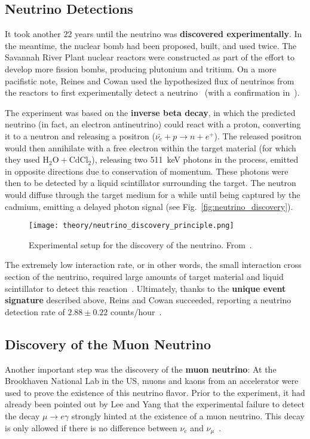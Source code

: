 \subsection{Neutrino Detections}
It took another 22 years until the neutrino was \textbf{discovered experimentally}. In the meantime, the nuclear bomb had been proposed, built, and used twice. The Savannah River Plant nuclear reactors were constructed as part of the effort to develop more fission bombs, producing plutonium and tritium. On a more pacifistic note, Reines and Cowan used the hypothesized flux of neutrinos from the reactors to first experimentally detect a neutrino~\cite{Reines1956} (with a confirmation in~).

The experiment was based on the \textbf{inverse beta decay}, in which the predicted neutrino (in fact, an electron antineutrino) could react with a proton, converting it to a neutron and releasing a positron ($\bar{\nu_e} + p \rightarrow n + e^+$). The released positron would then annihilate with a free electron within the target material (for which they used $\text{H}_2\text{O} + \text{CdCl}_2$), releasing two \SI{511}{\kilo\eV} photons in the process, emitted in opposite directions due to conservation of momentum. These photons were then to be detected by a liquid scintillator surrounding the target. The neutron would diffuse through the target medium for a while until being captured by the cadmium, emitting a delayed photon signal (see Fig.~\ref{fig:neutrino_discovery}).

\begin{figure}[htb]
    \texttt{[image: theory/neutrino\_discovery\_principle.png]}
    \caption[Neutrino discovery schematic]{Experimental setup for the discovery of the neutrino. From~\cite{Reines1956}.}
\end{figure}

The extremely low interaction rate, or in other words, the small interaction cross section of the neutrino, required large amounts of target material and liquid scintillator to detect this reaction~\cite{Giunti2007}. Ultimately, thanks to the \textbf{unique event signature} described above, Reins and Cowan succeeded, reporting a neutrino detection rate of $2.88 \pm 0.22$ counts/hour~\cite{Reines1956}.

\subsection{Discovery of the Muon Neutrino}
Another important step was the discovery of the \textbf{muon neutrino}: At the Brookhaven National Lab in the US, muons and kaons from an accelerator were used to prove the existence of this neutrino flavor. Prior to the experiment, it had already been pointed out by Lee and Yang that the experimental failure to detect the decay $\mu \rightarrow e \gamma$ strongly hinted at the existence of a muon neutrino. This decay is only allowed if there is no difference between $\nu_e$ and $\nu_\mu$~.

